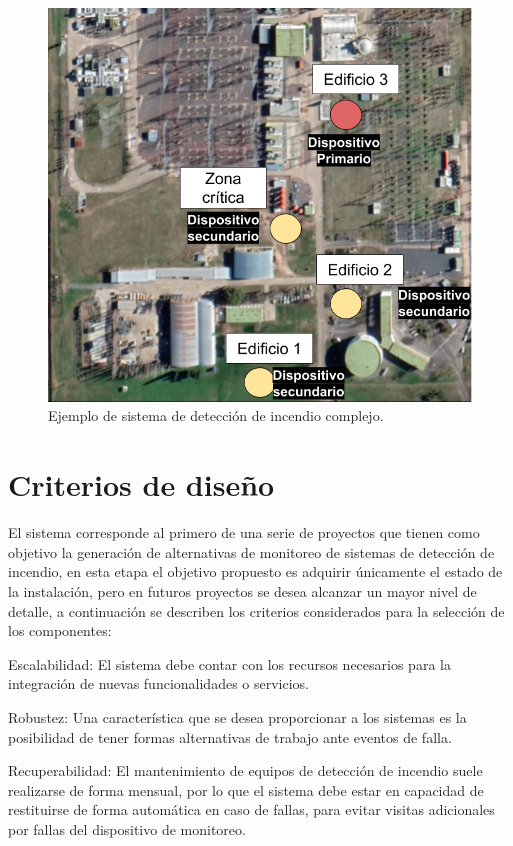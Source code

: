 \begin{figure}[]
	\centering
	\includegraphics[scale=.25]{./Figures/Capitulo3/Fig_A3.png}
	\caption{Ejemplo de sistema de detección de incendio complejo.}
	\label{fig:figura_a3}
\end{figure}

\section{Criterios de diseño}

El sistema corresponde al primero de una serie de proyectos que tienen como objetivo la generación de alternativas de monitoreo de sistemas de detección de incendio, en esta etapa el objetivo propuesto es adquirir únicamente el estado de la instalación, pero en futuros proyectos se desea alcanzar un mayor nivel de detalle, a continuación se describen los criterios considerados para la selección de los componentes:

Escalabilidad: El sistema debe contar con los recursos necesarios para la integración de nuevas funcionalidades o servicios.

Robustez: Una característica que se desea proporcionar a los sistemas es la posibilidad de tener formas alternativas de trabajo ante eventos de falla.

Recuperabilidad: El mantenimiento de equipos de detección de incendio suele realizarse de forma mensual, por lo que el sistema debe estar en capacidad de restituirse de forma automática en caso de fallas, para evitar visitas adicionales por fallas del dispositivo de monitoreo.

